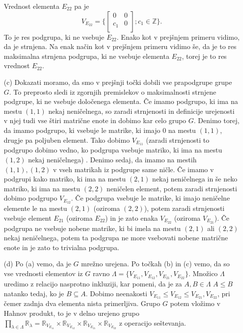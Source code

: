 \documentclass[a4paper, 12pt]{article}
\newcommand{\Z}{\mathbb{Z}}
\newcommand{\R}{\mathbb{R}}
\begin{document}
\begin{enumerate}
Vrednost elementa $E_{22}$ pa je 
$$
V_{E_{22}} = \big\{
\begin{bmatrix}
0 & 0 \\
c_1 & 0 \\
\end{bmatrix};
c_1 \in \Z
\big\}. 
$$
To je res podgrupa, ki ne vsebuje $E_{22}$. Enako kot v prejšnjem primeru vidimo, da je strnjena. Na enak način kot v prejšnjem primeru vidimo še, da je to res maksimalna strnjena podgrupa, ki ne vsebuje elementa $E_{22}$, torej je to res vrednost $E_{22}$.

\item[(c)] Dokazati moramo, da smo v prejšnji točki dobili vse prapodgrupe grupe $G$. To preprosto sledi iz zgornjih premislekov o maksimalnosti strnjene podgrupe, ki ne vsebuje določenega elementa. Če imamo podgrupo, ki ima na mestu $(1,1)$ nekaj neničelnega, so zaradi strnjenosti in definicije urejenosti v njej tudi vse štiri matrične enote in dobimo kar celo grupo $G$. Denimo torej, da imamo podgrupo, ki vsebuje le matrike, ki imajo 0 na mestu $(1,1)$, drugje pa poljuben element. Tako dobimo $V_{E_{11}}$ (zaradi strnjenosti to podgrupo dobimo vedno, ko podgrupa vsebuje matriko, ki ima na mestu $(1,2)$ nekaj neničelnega) . Denimo sedaj, da imamo na mestih $(1,1),(1,2)$ v vseh matrikah iz podgrupe same ničle. Če imamo v podgrupi kako matriko, ki ima na mestu $(2,1)$ nekaj neničelnega in še neko matriko, ki ima na mestu $(2,2)$ neničelen element, potem zaradi strnjenosti dobimo podgrupo $V_{E_{12}}$. Če podgrupa vsebuje le matrike, ki imajo neničelne elemente le na mestu $(2,1)$ (oziroma $(2,2)$), potem zaradi strnjenosti vsebuje element $E_{21}$ (oziroma $E_{22}$) in je zato enaka $V_{E_{22}}$ (oziroma $V_{E_{21}}$). Če podgrupa ne vsebuje nobene matrike, ki bi imela na mestu $(2,1)$ ali $(2,2)$ nekaj neničelnega, potem ta podgrupa ne more vsebovati nobene matrične enote in je zato to trivialna podgrupa. 

\item[(d)] Po (a) vemo, da je $G$ mrežno urejena. Po točkah (b) in (c) vemo, da so vse vrednosti elementov iz $G$ ravno $\Lambda=\{V_{E_{11}}, V_{E_{12}}, V_{E_{21}}, V_{E_{22}}\}$. Množico $\Lambda$ uredimo z relacijo nasprotno inkluziji, kar pomeni, da je za $A,B\in \Lambda$ $A\le B$ natanko tedaj, ko je $B\subseteq A$. Dobimo neenakosti $V_{E_{11}} \le V_{E_{12}} \le V_{E_{21}}, V_{E_{22}}$, pri čemer zadnja dva elementa nista primerljiva.  Grupo $G$ potem vložimo v Hahnov produkt, to je v delno urejeno grupo $\prod_{\lambda \in \Lambda} \R_{\lambda} = \R_{V_{E_{11}}} \times \R_{V_{E_{12}}} \times\R_{V_{E_{21}}} \times \R_{V_{E_{22}}}$  z operacijo seštevanja. 
\end{enumerate}
\end{document}
